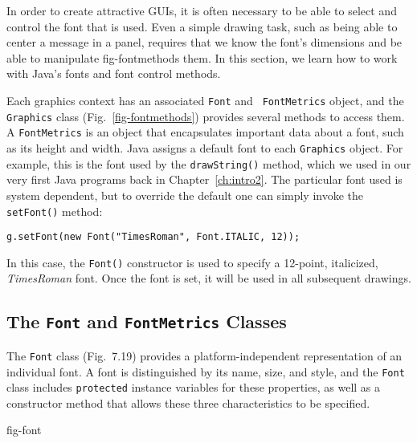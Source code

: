 
\noindent In order to create attractive GUIs, it is often necessary to
be able to select and control the font that is used.  Even a simple
drawing task, such as being able to center a message in a panel,
requires that we know the font's dimensions and be able to manipulate
{fig-fontmethods}
them.  In this section, we learn how to work with Java's fonts and
font control methods.

Each graphics context has an associated {\tt Font} and {\tt
FontMetrics} object, and the {\tt Graphics} class
(Fig.~\ref{fig-fontmethods}) provides several methods to access them.
A {\tt FontMetrics} is an object that encapsulates important data
about a font, such as its height and width.  Java assigns a default
font to each {\tt Graphics} object.  For example, this is the font
used by the {\tt drawString()} method, which we used in our very first
Java programs back in Chapter~\ref{ch:intro2}.  The particular font used is system
dependent, but to override the default one can simply invoke the {\tt
setFont()} method:

\begin{jjjlisting}
\begin{lstlisting}
g.setFont(new Font("TimesRoman", Font.ITALIC, 12));
\end{lstlisting}
\end{jjjlisting}

\noindent In this case, the {\tt Font()} constructor is used
to specify a 12-point, italicized, {\it TimesRoman} font.  Once the
font is set, it will be used in all subsequent drawings.

\subsection{The {\tt Font} and {\tt FontMetrics} Classes}
\noindent The {\tt Font} class (Fig.~7.19) provides a
platform-independent representation of an individual font.  A font is
distinguished by its name, size, and style, and the {\tt Font} class
includes {\tt protected} instance variables for these properties, as
well as a constructor method that allows these three characteristics
to be specified. 

{fig-font}


